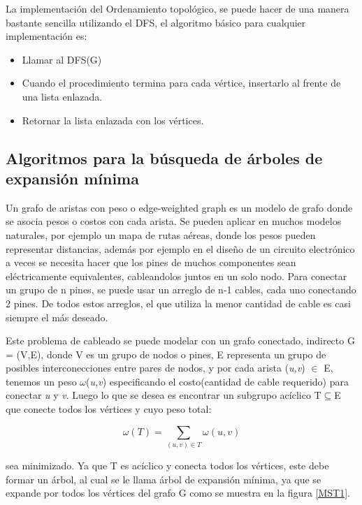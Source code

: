 \documentclass[a4paper, 11pt]{report}
\begin{document}
La implementaci\'on del Ordenamiento topol\'ogico, se puede hacer de una manera bastante sencilla utilizando el DFS, el algoritmo b\'asico para cualquier implementaci\'on es:

\begin{itemize}
    \item Llamar al DFS(G)
    \item Cuando el procedimiento termina para cada v\'ertice, insertarlo al frente de una lista enlazada.
    \item Retornar la lista enlazada con los v\'ertices.
\end{itemize} 

\subsection{Algoritmos para la b\'usqueda de \'arboles de expansi\'on m\'inima}
Un grafo de aristas con peso o edge-weighted graph es un modelo de grafo donde se asocia pesos o costos con cada arista. Se pueden aplicar en muchos modelos naturales, por ejemplo un mapa de rutas aéreas, donde los pesos pueden representar distancias, además por ejemplo en el diseño de un circuito electrónico a veces se necesita hacer que los pines  de muchos componentes sean eléctricamente equivalentes, cableandolos juntos en un solo nodo. Para conectar un grupo de n pines, se puede usar un arreglo de n-1 cables, cada uno conectando 2 pines. De todos estos arreglos, el que utiliza la menor cantidad de cable es casi siempre el más deseado. 

Este problema de cableado se puede modelar con un grafo conectado, indirecto G = (V,E), donde V es un grupo de nodos o pines, E representa un grupo de posibles interconecciones entre pares de nodos, y por cada arista (\textit{u,v}) $\in$  E, tenemos un peso $\omega$(\textit{u,v}) especificando el costo(cantidad de cable requerido) para conectar \textit{u} y \textit{v}. Luego lo que se desea es encontrar un subgrupo acíclico T$ \subseteq $E que conecte todos los vértices y cuyo peso total:

\begin{equation}
 \omega (T) =  \sum_{(u,v) \in T}  \omega (u,v) 
\end{equation}

sea minimizado. Ya que T es acíclico y conecta todos los vértices, este debe formar un árbol, al cual se le llama árbol de expansión mínima, ya que se expande por todos los vértices del grafo G como se muestra en la figura \ref{MST1}. 
\end{document}
